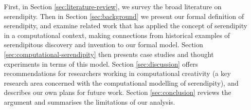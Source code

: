 First, in
Section \ref{sec:literature-review}, we survey the broad literature on
serendipity. Then in Section \ref{sec:background} we present our formal
definition of serendipity, and examine related work that has applied
the concept of serendipity in a computational context, making connections from historical examples of
serendipitous discovery and invention to our formal model.  Section
\ref{sec:computational-serendipity} then presents case studies and
thought experiments in terms of this model.  Section
\ref{sec:discussion} offers recommendations for researchers working in
computational creativity (a key research area concerned with the computational modelling of serendipity), and describes our own plans for future
work.  Section \ref{sec:conclusion} reviews the argument and
summarises the limitations of our analysis.


